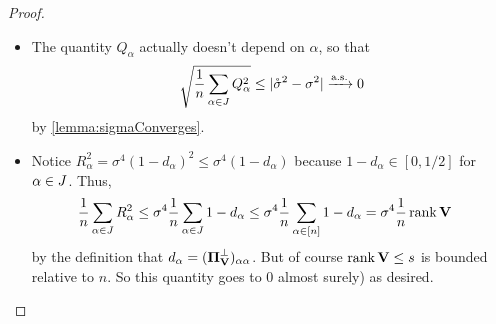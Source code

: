 \documentclass[main.tex]{subfiles}
\begin{document}
\begin{proof}
\begin{itemize}
\begin{align*}
                C \times 0 \times \mathcal{E} = 0
        \end{align*}
        where $\mathcal{E}$ is the Gaussian expectation that $\f 1 n \sum_{\alpha \in [n]} \lp
                    \sum_{i=1}^r (\xme_\alpha^i)^2
                    + \sum_{j=1}^s (\vme_\alpha^j)^2
                    \rp$ converges a.s. to, by inductive hypothesis.
    \item
        The quantity $Q_\alpha$ actually doesn't depend on $\alpha$, so that
        \[\sqrt{\frac{1}{n} \sum_{\alpha \in J} Q_\alpha^2} \le |\mathring \sigma^2 - \sigma^2| \xrightarrow{\mathrm{a.s.}} 0\]
        by \cref{lemma:sigmaConverges}.
    \item
        Notice $R_\alpha^2 = \sigma^4 (1 - d_\alpha)^2 \le \sigma^4 (1 - d_\alpha)$ because $1 - d_\alpha \in [0, 1/2]$ for $\alpha \in J$.
        Thus,
        \begin{align*}
        \frac{1}{n} \sum_{\alpha \in J} R_\alpha^2
            &\le
                \sigma^4 \frac{1}{n} \sum_{\alpha \in J} 1 - d_\alpha
            \le 
                \sigma^4 \frac{1}{n} \sum_{\alpha \in [n]} 1 - d_\alpha
            =
                \sigma^4 \frac{1}{n} \operatorname{rank} \mathbf{V}
        \end{align*}
        by the definition that $d_\alpha = (\boldsymbol{\Pi}^\perp_{\mathbf{V}})_{\alpha\alpha}$.
        But of course $\operatorname{rank} \mathbf{V} \le s$ is bounded relative to $n$.
        So this quantity goes to 0 almost surely) as desired.
    \end{itemize}
\end{proof}
\end{document}
